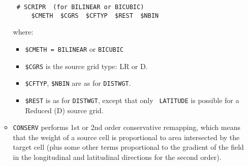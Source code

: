 \begin{itemize}
\begin{itemize}
  \begin{verbatim}
 # SCRIPR  (for BILINEAR or BICUBIC)
     $CMETH  $CGRS  $CFTYP  $REST  $NBIN
\end{verbatim}
    \vspace{-0.5cm} where:
    \begin{itemize}
    \item {\tt \$CMETH = BILINEAR} or {\tt BICUBIC}
    \item {\tt \$CGRS} is the source grid type: LR or D.
    \item {\tt \$CFTYP}, {\tt \$NBIN} are as for {\tt DISTWGT}.
    \item {\tt \$REST} is as for {\tt DISTWGT}, except that only {\tt
        LATITUDE} is possible for a Reduced (D) source grid.
    \end{itemize}

  \item {\tt CONSERV} performs 1st or 2nd order conservative
    remapping, which means that the weight of a source cell is
    proportional to area intersected by the target cell (plus some
    other terms proportional to the gradient of the field in the
    longitudinal and latitudinal directions for the second order).


\end{itemize}
\end{itemize}
